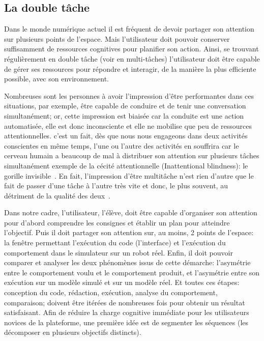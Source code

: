     \subsection{La double tâche}\label{sec:double-tache}
        Dans le monde numérique actuel il est fréquent de devoir partager son attention sur plusieurs points de l'espace. Mais l'utilisateur doit pouvoir conserver suffisamment de ressources cognitives pour planifier son action. Ainsi, se trouvant régulièrement en double tâche (voir en multi-tâches) l'utilisateur doit être capable de gérer ses ressources pour répondre et interagir, de la manière la plus efficiente possible, avec son environnement.\par%
        Nombreuses sont les personnes à avoir l’impression d’être performantes dans ces situations, par exemple, être capable de conduire et de tenir une conversation simultanément; or, cette impression est biaisée car la conduite est une action automatisée, elle est donc inconsciente et elle ne mobilise que peu de ressources attentionnelles. c'est un fait, dès que nous nous engageons dans deux activités conscientes en même temps, l’une ou l’autre des activités en souffrira car le cerveau humain a beaucoup de mal à distribuer son attention sur plusieurs tâches simultanément \eg exemple de la cécité attentionnelle (Inattentional blindness): le gorille invisible~. En fait, l’impression d’être multitâche n’est rien d’autre que le fait de passer d’une tâche à l’autre très vite et donc, le plus souvent, au détriment de la qualité des deux~.\par%
        Dans notre cadre, l'utilisateur, l'élève, doit être capable d'organiser son attention pour d'abord comprendre les consignes et établir un plan pour atteindre l'objectif. Puis il doit partager son attention sur, au moins, 2 points de l'espace: la fenêtre permettant l'exécution du code (l'interface) et l'exécution du comportement dans le simulateur \etou sur un robot réel. Enfin, il doit pouvoir comparer et analyser les deux phénomènes issus de cette démarche: l'asymétrie entre le comportement voulu et le comportement produit, et l'asymétrie entre son exécution sur un modèle simulé et sur un modèle réel. Et toutes ces étapes: conception du code, rédaction, exécution, analyse du comportement, comparaison; doivent être itérées de nombreuses fois pour obtenir un résultat satisfaisant.
        Afin de réduire la charge cognitive immédiate pour les utilisateurs novices de la plateforme, une première idée est de segmenter les séquences (\ie les décomposer en plusieurs objectifs distincts). 
